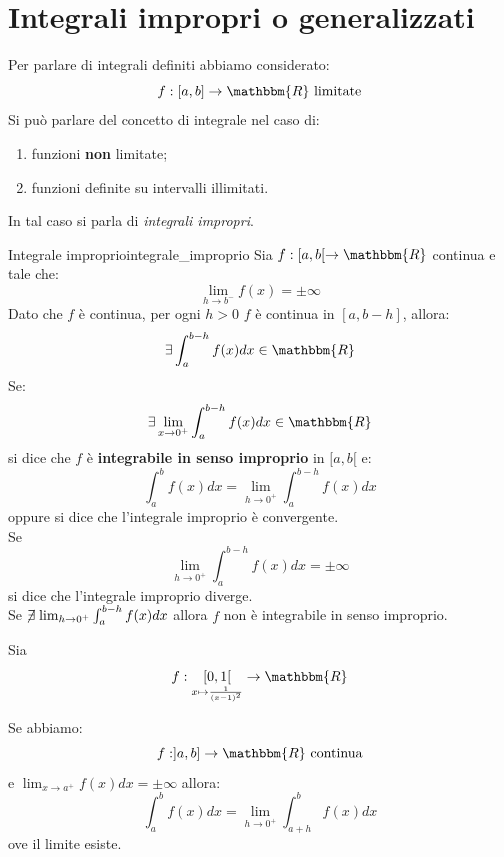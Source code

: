 \documentclass[12pt]{report}
\newcounter{definition}
\newcommand{\nmu}{}
\begin{document}
		\section{Integrali impropri o generalizzati}
		Per parlare di integrali definiti abbiamo considerato:
		\[
		f:[a,b] \to \mathbbm{R} \ \text{limitate}
		\]
		Si può parlare del concetto di integrale nel caso di:
		\begin{enumerate}[label=(\arabic*)]
			\item funzioni \textbf{non} limitate;
			\item funzioni definite su intervalli illimitati.
		\end{enumerate}
		In tal caso si parla di \textit{integrali impropri}.
		\begin{definition}{\nmu Integrale improprio}{integrale_improprio}
			Sia $f:[a,b[ \to \mathbbm{R}$ continua e tale che:
			\[
			\lim_{h \to b^-}f(x) = \pm\infty
			\]
			Dato che $f$ è continua, per ogni $h > 0$ $f$ è continua in $[a, b-h]$, allora:
			\[
			\exists \int_{a}^{b-h}f(x)dx \in \mathbbm{R}
			\]
			Se:
			\[
			\exists \lim_{x \to {0^+}}\int_{a}^{b-h}f(x)dx \in \mathbbm{R}
			\]
			si dice che $f$ è \textbf{integrabile in senso improprio} in $[a, b[$ e:
			\[
			\int_{a}^{b}f(x)dx = \lim_{h\to {0^+}}\int_{a}^{b-h}f(x)dx
			\]
			oppure si dice che l'integrale improprio è convergente. \\
			Se
			\[
			\lim_{h \to {0^+}}\int_{a}^{b-h}f(x)dx = \pm\infty
			\]
			si dice che l'integrale improprio diverge. \\
			Se $\centernot{\exists}\lim_{h \to {0^+}}\int_{a}^{b-h}f(x)dx$ allora $f$ non è integrabile in senso improprio.
		\end{definition}
		\begin{example}{}{}
			Sia
			\[f: \underset{ x\mapsto \frac{1}{(x-1)^2}}{[0, 1[} \to \mathbbm{R}\]
		\end{example}
		Se abbiamo:
		\[
		f: ]a, b] \to \mathbbm{R}\ \text{continua}
		\]
		e $\lim_{x \to {a^+}}f(x)dx = \pm\infty$ allora:
		\[
		\int_{a}^{b}f(x)dx = \lim_{h \to {0^+}}\int_{a+h}^{b}f(x)dx
		\]
		ove il limite esiste.
\end{document}
